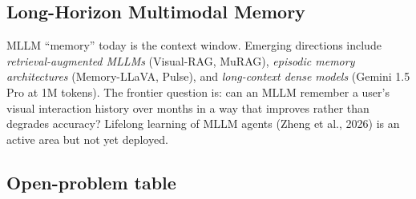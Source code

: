 \subsection{Long-Horizon Multimodal Memory}\label{long-horizon-multimodal-memory}

MLLM ``memory'' today is the context window. Emerging directions include \emph{retrieval-augmented MLLMs} (Visual-RAG, MuRAG), \emph{episodic memory architectures} (Memory-LLaVA, Pulse), and \emph{long-context dense models} (Gemini 1.5 Pro at 1M tokens). The frontier question is: can an MLLM remember a user's visual interaction history over months in a way that improves rather than degrades accuracy? Lifelong learning of MLLM agents (Zheng et al., 2026) is an active area but not yet deployed.

\subsection{Open-problem table}\label{open-problem-table}


